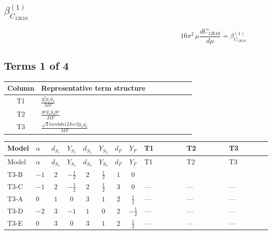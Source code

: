 \documentclass[8pt]{article}
\begin{document}
\begin{landscape}
\section*{$\beta_{C_{12610}}^{(1)}$}
\[16\pi^2\,\mu\frac{d C_{12610}}{d\mu}=\beta_{C_{12610}}^{(1)}\]
\subsection*{Terms 1 of 4}
\begin{center}
\begin{tabular}{@{}c >{\raggedright\arraybackslash}p{0.82\linewidth}@{}}
\toprule
Column & Representative term structure \\
\midrule
T1 & \(\displaystyle \frac{g_{2}^{2} \overline{y_{1}} \overline{y_{2}}}{MF}\) \\
\midrule
T2 & \(\displaystyle \frac{ye \overline{y_{1}} \overline{y_{2}} \overline{ye}}{MF}\) \\
\midrule
T3 & \(\displaystyle \frac{\sqrt{3} lambda12Inv2 \overline{y_{1}} \overline{y_{2}}}{MF}\) \\
\midrule
\bottomrule
\end{tabular}
\end{center}
\smallskip
\tiny
\begin{longtable}{@{}llcccccc >{\raggedright\arraybackslash}p{0.21\linewidth} >{\raggedright\arraybackslash}p{0.21\linewidth} >{\raggedright\arraybackslash}p{0.21\linewidth}@{}}
\toprule
Model & $\alpha$ & $d_{S_1}$ & $Y_{S_1}$ & $d_{S_2}$ & $Y_{S_2}$ & $d_F$ & $Y_F$ & T1 & T2 & T3 \\
\midrule
\endfirsthead
\toprule
Model & $\alpha$ & $d_{S_1}$ & $Y_{S_1}$ & $d_{S_2}$ & $Y_{S_2}$ & $d_F$ & $Y_F$ & T1 & T2 & T3 \\
\midrule
\endhead
T3-B & $-1$ & $2$ & $-\frac{1}{2}$ & $2$ & $\frac{1}{2}$ & $1$ & $0$ & \scriptsize\adjustbox{max width=\linewidth}{$\begin{gathered} \frac{3 g_{2}^{2} \overline{y_{1}} \overline{y_{2}}}{8 MF}\end{gathered}$} & \scriptsize\adjustbox{max width=\linewidth}{$\begin{gathered} - \frac{ye \overline{y_{1}} \overline{y_{2}} \overline{ye}}{8 MF}\end{gathered}$} & \scriptsize\adjustbox{max width=\linewidth}{$\begin{gathered} \frac{\sqrt{3} lambda12Inv2 \overline{y_{1}} \overline{y_{2}}}{6 MF}\end{gathered}$} \\
\midrule
T3-C & $-1$ & $2$ & $-\frac{1}{2}$ & $2$ & $\frac{1}{2}$ & $3$ & $0$ & --- & --- & --- \\
\midrule
T3-A & $0$ & $1$ & $0$ & $3$ & $1$ & $2$ & $\frac{1}{2}$ & --- & --- & --- \\
\midrule
T3-D & $-2$ & $3$ & $-1$ & $1$ & $0$ & $2$ & $-\frac{1}{2}$ & --- & --- & --- \\
\midrule
T3-E & $0$ & $3$ & $0$ & $3$ & $1$ & $2$ & $\frac{1}{2}$ & --- & --- & --- \\
\midrule
\bottomrule
\end{longtable}
\clearpage

\end{landscape}
\end{document}
